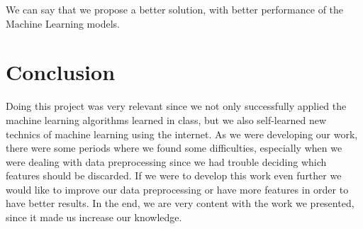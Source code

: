 \documentclass[conference]{IEEEtran}
\begin{document}
We can say that we propose a better solution, with better performance of the Machine Learning models.

\section{Conclusion}

Doing this project was very relevant since we not only successfully applied the machine learning algorithms learned in class, but we also self-learned new technics of machine learning using the internet. 
As we were developing our work, there were some periods where we found some difficulties, especially when we were dealing with data preprocessing since we had trouble deciding which features should be discarded. If we were to develop this work even further we would like to improve our data preprocessing or have more features in order to have better results.
 In the end, we are very content with the work we presented, since it made us increase our knowledge.


\printbibliography
\end{document}
